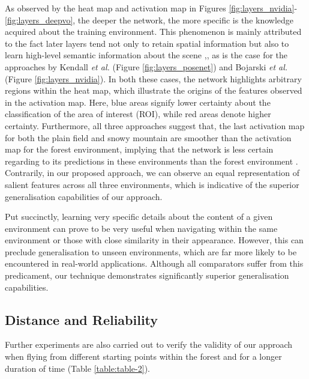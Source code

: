 \documentclass[letterpaper, 10 pt, journal, twoside]{IEEEtran}
\newcommand{\etal}{\emph{et al.}}
\begin{document}
As observed by the heat map and activation map in Figures \ref{fig:layers_nvidia}-\ref{fig:layers_deepvo}, the deeper the network, the more specific is the knowledge acquired about the training environment. This phenomenon is mainly attributed to the fact later layers tend not only to retain spatial information but also to learn high-level semantic information about the scene \cite{richter2017safe},\cite{selvaraju2017grad}, as is the case for the approaches by Kendall \etal    \cite{kendall2015posenet} (Figure \ref{fig:layers_posenet}) and Bojarski \etal \cite{bojarski2016end} (Figure \ref{fig:layers_nvidia}). In both these cases, the network highlights arbitrary regions within the heat map, which illustrate the origins of the features observed in the activation map. Here, blue areas signify lower certainty about the classification of the area of interest (ROI), while red areas denote higher certainty.  Furthermore, all three approaches \cite{kendall2015posenet, bojarski2016end, wang2017deepvo} suggest that, the last activation map for both the plain field and snowy mountain are smoother than the activation map for the forest environment, implying that the network is less certain regarding to its predictions in these environments than the forest environment \cite{richter2017safe}. Contrarily, in our proposed approach, we can observe an equal representation of salient features across all three environments, which is indicative of the superior generalisation capabilities of our approach.

Put succinctly, learning very specific details about the content of a given environment can prove to be very useful when navigating within the same environment or those with close similarity in their appearance. However, this can preclude generalisation to unseen environments, which are far more likely to be encountered in real-world applications. Although all comparators \cite{kendall2015posenet, bojarski2016end, wang2017deepvo} suffer from this predicament, our technique demonstrates significantly superior generalisation capabilities.

\subsection{Distance and Reliability}
Further experiments are also carried out to verify the validity of our approach when flying from different starting points within the forest and for a longer duration of time (Table \ref{table:table-2}). 
 
\end{document}
